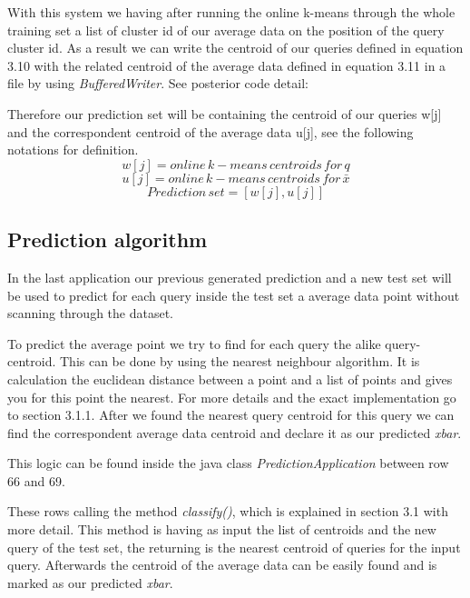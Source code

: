 \documentclass{lmproj}
\begin{document}
With this system we having after running the online k-means through the whole training set a list of cluster id of our average data on the position of the query cluster id. As a result we can write the centroid of our queries defined in equation 3.10 with the related centroid of the average data defined in equation 3.11 in a file by using \textit{BufferedWriter}. See posterior code detail:


Therefore our prediction set will be containing the centroid of our queries w[j] and the correspondent centroid of the average data u[j], see the following notations for definition.
\begin{equation}
w[j]= online\,k-means\,centroids\,for\,q
\end{equation}
\begin{equation}
u[j]= online\,k-means\,centroids\,for\,\bar{x}
\end{equation}
\begin{equation}
Prediction\,set=[w[j],u[j]]
\end{equation}

\subsection{Prediction algorithm}

In the last application our previous generated prediction and a new test set will be used to predict for each query inside the test set a average data point without scanning through the dataset.

To predict the average point we try to find for each query the alike query-centroid. This can be done by using the nearest neighbour algorithm. It is calculation the euclidean distance between a point and a list of points and gives you for this point the nearest. For more details and the exact implementation go to section 3.1.1. After we found the nearest query centroid for this query we can find the correspondent average data centroid and declare it as our predicted \textit{xbar}.  

This logic can be found inside the java class \textit{PredictionApplication} between row 66 and 69. 


These rows calling the method \textit{classify()}, which is explained in section 3.1 with more detail. This method is having as input the list of centroids and the new query of the test set, the returning is the nearest centroid of queries for the input query. Afterwards the centroid of the average data can be easily found and is marked as our predicted \textit{xbar}.
\end{document}
